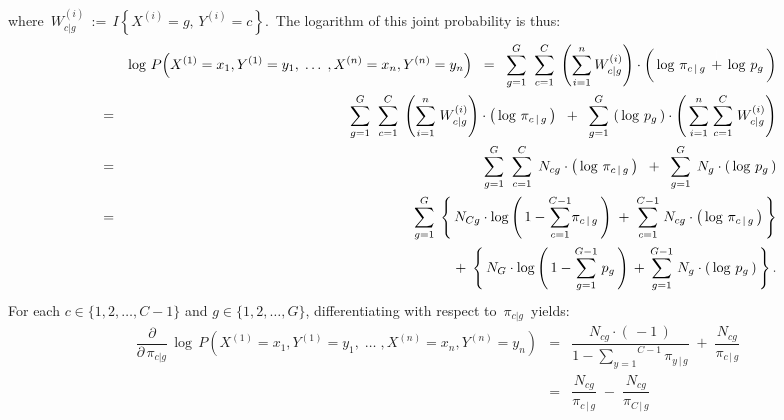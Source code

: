 \begin{enumerate}
	where
	\,$W^{(i)}_{c \vert g} \,:=\, I\!\left\{X^{(i)}=g,\,Y^{(i)}=c\right\}$.\,
	The logarithm of this joint probability is thus:
	\begin{eqnarray*}
	&&
		\log\,P\!\left(X^{(1)} = x_{1},Y^{(1)}=y_{1}, \;\ldots\; ,X^{(n)} = x_{n},Y^{(n)}=y_{n}\right)
	\;\;=\;\;
		\overset{G}{\underset{g=1}{\sum}} \;\; \overset{C}{\underset{c=1}{\sum}} \;
		\left(\overset{n}{\underset{i=1}{\sum}}\,W^{(i)}_{c \vert g}\right)
		\cdot
		\left(\,\log\,\pi_{c\,\vert\,g} \,\overset{{\color{white}\vert}}{+}\, \log\,p_{g}\,\right)
	\\
	&=&
		\overset{G}{\underset{g=1}{\sum}} \;\; \overset{C}{\underset{c=1}{\sum}} \;
		\left(\overset{n}{\underset{i=1}{\sum}}\;W^{(i)}_{c \vert g}\right)
		\cdot
		\left(\,\log\,\pi_{c\,\vert\,g}\,\right)
		\;\; + \;\;
		\overset{G}{\underset{g=1}{\sum}} \, \left(\,\log\,p_{g}\,\right)
		\cdot
		\left(\,
			\overset{n}{\underset{i=1}{\sum}} \;
			\overset{C}{\underset{c=1}{\sum}} \;
			W^{(i)}_{c \vert g}
		\right)
	\\
	&=&
		\overset{G}{\underset{g=1}{\sum}} \;\; \overset{C}{\underset{c=1}{\sum}} \;\,
		N_{cg} \cdot \left(\,\log\,\pi_{c\,\vert\,g}\,\right)
		\;\; + \;\;
		\overset{G}{\underset{g=1}{\sum}} \;\, N_{g} \cdot \left(\,\log\,p_{g}\,\right)
	\\
	&=&
		\overset{G}{\underset{g=1}{\sum}} \;
		\left\{\,
			N_{Cg}
			\cdot
			\log\left(\,1 - \overset{C-1}{\underset{c=1}{\sum}}\pi_{c\,\vert\,g}\,\right)
			\; + \;
			\overset{C-1}{\underset{c=1}{\sum}} \; N_{cg}
			\cdot
			\left(\,\log\,\pi_{c\,\vert\,g}\,\right)
		\,\right\}
	\\
	&&
		+ \;
		\left\{\,
			N_{G}
			\cdot
			\log\left(\,1 - \overset{G-1}{\underset{g=1}{\sum}}\;p_{g}\,\right)
			\, + \,
			\overset{G-1}{\underset{g=1}{\sum}} \; N_{g}
			\cdot
			\left(\,\log\,p_{g}\,\right)
		\,\right\}.
	\end{eqnarray*}
	For each $c \in \{1,2,\ldots,C-1\}$ and $g \in \{1,2,\ldots,G\}$,
	differentiating with respect to \,$\pi_{c \vert g}$\, yields:
	\begin{eqnarray*}
	\dfrac{\partial}{\partial\,\pi_{c \vert g}}\,
	\log\,P\!\left(X^{(1)} = x_{1},Y^{(1)}=y_{1}, \;\ldots\; ,X^{(n)} = x_{n},Y^{(n)}=y_{n}\right)
	&=&
		\dfrac{N_{cg}\cdot(\,-1\,)}{1 - \overset{C-1}{\underset{y=1}{\sum}}\pi_{y\,\vert\,g}}
		\; + \;
		\dfrac{N_{cg}}{\pi_{c\,\vert\,g}}
	\\
	&=&
		\dfrac{N_{cg}}{\pi_{c\,\vert\,g}}
		\; - \;
		\dfrac{N_{cg}}{\pi_{C\,\vert\,g}}
	\end{eqnarray*}

\end{enumerate}
